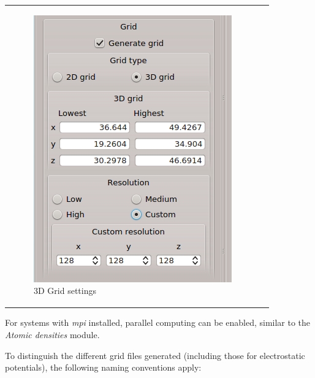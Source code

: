 \documentclass[10pt]{article}
\begin{document}
\begin{tabular}{lr}
\begin{minipage}{.4\linewidth}
\begin{figure}[H]
\vspace*{-5mm}
\begin{center}
\includegraphics[width=.5\linewidth]{damqt_fig_2_2_7.png}
\end{center}
\caption{3D Grid settings\label{fig:19}}
\end{figure}
\end{minipage}
\end{tabular}
\vspace*{1mm}


For systems with {\it mpi} installed, parallel computing can be enabled,
similar to the {\it Atomic densities} module.

To distinguish the different grid files generated (including those for electrostatic potentials),
the following naming conventions apply:
\end{document}
